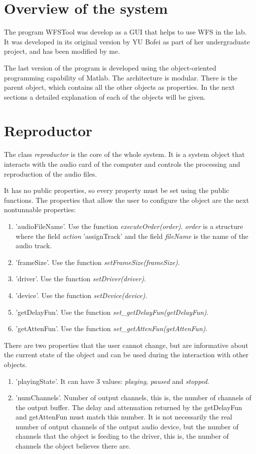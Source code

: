 \section{Overview of the system}
The program WFSTool was develop as a GUI that helps to use WFS in the lab. It was developed in its original version by YU Bofei as part of her undergraduate project, and has been modified by me.

The last version of the program is developed using the object-oriented programming capability of Matlab. The architecture is modular. There is the parent object, which contains all the other objects as properties. In the next sections a detailed explanation of each of the objects will be given.

\section{Reproductor}
The class \textit{reproductor} is the core of the whole system. It is a system object that interacts with the audio card of the computer and controls the processing and reproduction of the audio files.

It has no public properties, so every property must be set using the public functions. The properties that allow the user to configure the object are the next nontunnable properties:

\begin{enumerate}
	\item 'audioFileName'. Use the function \textit{executeOrder(order)}. \textit{order} is a structure where the field \textit{action} 'assignTrack' and the field \textit{fileName} is the name of the audio track.
	\item 'frameSize'. Use the function \textit{setFrameSize(frameSize)}.
	\item 'driver'. Use the function \textit{setDriver(driver)}.
	\item 'device'. Use the function \textit{setDevice(device)}.
	\item 'getDelayFun'. Use the function \textit{set\_getDelayFun(getDelayFun)}.
	\item 'getAttenFun'. Use the function \textit{set\_getAttenFun(getAttenFun)}.
\end{enumerate}

There are two properties that the user cannot change, but are informative about the current state of the object and can be used during the interaction with other objects.

\begin{enumerate}
	\item 'playingState'. It can have 3 values: \textit{playing}, \textit{paused} and \textit{stopped}.
	\item 'numChannels'. Number of output channels, this is, the number of channels of the output buffer. The delay and attenuation returned by the getDelayFun and getAttenFun must match this number. It is not necessarily the real number of output channels of the output audio device, but the number of channels that the object is feeding to the driver, this is, the number of channels the object believes there are.
\end{enumerate}

